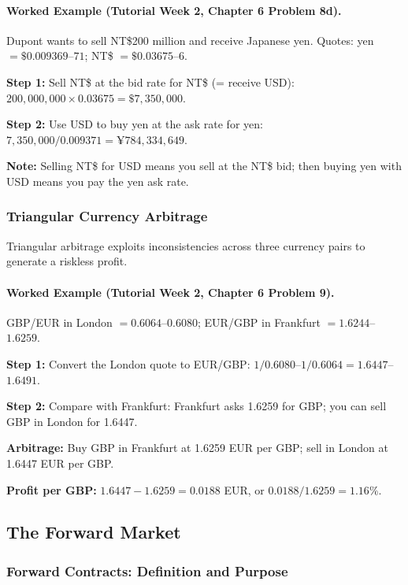 \documentclass[11pt,a4paper]{article}
\begin{document}
\paragraph{Worked Example (Tutorial Week 2, Chapter 6 Problem 8d).}
Dupont wants to sell NT\$200 million and receive Japanese yen. Quotes: yen $= \$0.009369$--$71$; NT\$ $= \$0.03675$--$6$.

\textbf{Step 1:} Sell NT\$ at the bid rate for NT\$ (= receive USD): $200{,}000{,}000 \times 0.03675 = \$7{,}350{,}000$.

\textbf{Step 2:} Use USD to buy yen at the ask rate for yen: $7{,}350{,}000 / 0.009371 = ¥784{,}334{,}649$.

\textbf{Note:} Selling NT\$ for USD means you sell at the NT\$ bid; then buying yen with USD means you pay the yen ask rate.

\subsubsection{Triangular Currency Arbitrage}

Triangular arbitrage exploits inconsistencies across three currency pairs to generate a riskless profit.

\paragraph{Worked Example (Tutorial Week 2, Chapter 6 Problem 9).}
GBP/EUR in London $= 0.6064$--$0.6080$; EUR/GBP in Frankfurt $= 1.6244$--$1.6259$.

\textbf{Step 1:} Convert the London quote to EUR/GBP: $1/0.6080$--$1/0.6064 = 1.6447$--$1.6491$.

\textbf{Step 2:} Compare with Frankfurt: Frankfurt asks 1.6259 for GBP; you can sell GBP in London for 1.6447.

\textbf{Arbitrage:} Buy GBP in Frankfurt at 1.6259 EUR per GBP; sell in London at 1.6447 EUR per GBP.

\textbf{Profit per GBP:} $1.6447 - 1.6259 = 0.0188$ EUR, or $0.0188/1.6259 = 1.16\%$.

\subsection{The Forward Market}

\subsubsection{Forward Contracts: Definition and Purpose}
\end{document}
